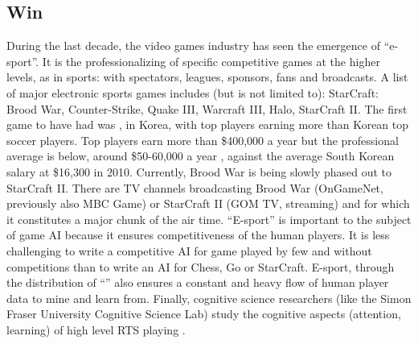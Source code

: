 \subsection{Win}
During the last decade, the video games industry has seen the emergence of ``e-sport''. It is the professionalizing of specific competitive games at the higher levels, as in sports: with spectators, leagues, sponsors, fans and broadcasts. A %
list of major electronic sports games includes (but is not limited to): StarCraft: Brood War, Counter-Strike, Quake III, Warcraft III, Halo, StarCraft II. The first game to have had  was , in Korea, with top players earning more than Korean top soccer players. Top players earn more than \$400,000 a year but the professional average is below, around \$50-60,000 a year \citep{TeamLiquidPGMIncome}, against the average South Korean salary at \$16,300 in 2010. Currently, Brood War is being slowly phased out to StarCraft II. %
There are TV channels broadcasting Brood War (OnGameNet, previously also MBC Game) or StarCraft II (GOM TV, streaming) and for which it constitutes a major chunk of the air time. %
``E-sport'' is important to the subject of game AI because it ensures competitiveness of the human players. It is less challenging to write a competitive AI for game played by few and without competitions than to write an AI for Chess, Go or StarCraft. E-sport, through the distribution of ``'' also ensures a constant and heavy flow of human player data to mine and learn from. Finally, cognitive science researchers (like the Simon Fraser University Cognitive Science Lab) study the cognitive aspects (attention, learning) of high level RTS playing \citep{SkillCraft}.


